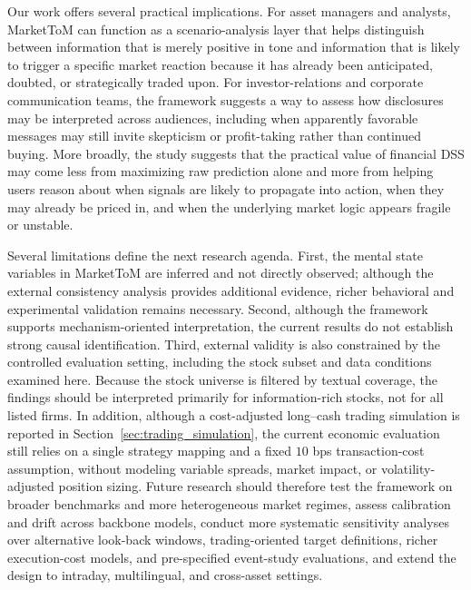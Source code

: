 \documentclass[a4paper,fleqn,doubleblind]{cas-sc}
\newcommand{\revise}[1]{{\color{blue}#1}}
\begin{document}
Our work offers several practical implications. For asset managers and analysts, MarketToM can function as a scenario-analysis layer that helps distinguish between information that is merely positive in tone and information that is likely to trigger a specific market reaction because it has already been anticipated, doubted, or strategically traded upon. For investor-relations and corporate communication teams, the framework suggests a way to assess how disclosures may be interpreted across audiences, including when apparently favorable messages may still invite skepticism or profit-taking rather than continued buying. More broadly, the study suggests that the practical value of financial DSS may come less from maximizing raw prediction alone and more from helping users reason about when signals are likely to propagate into action, when they may already be priced in, and when the underlying market logic appears fragile or unstable.

Several limitations define the next research agenda. First, the mental state variables in MarketToM are inferred and not directly observed; although the external consistency analysis provides additional evidence, richer behavioral and experimental validation remains necessary. Second, although the framework supports mechanism-oriented interpretation, the current results do not establish strong causal identification. Third, external validity is also constrained by the controlled evaluation setting, including the stock subset and data conditions examined here. \revise{Because the stock universe is filtered by textual coverage, the findings should be interpreted primarily for information-rich stocks, not for all listed firms. In addition, although a cost-adjusted long--cash trading simulation is reported in Section~\ref{sec:trading_simulation}, the current economic evaluation still relies on a single strategy mapping and a fixed $10$ bps transaction-cost assumption, without modeling variable spreads, market impact, or volatility-adjusted position sizing.} Future research should therefore test the framework on broader benchmarks and more heterogeneous market regimes, assess calibration and drift across backbone models, \revise{conduct more systematic sensitivity analyses over alternative look-back windows, trading-oriented target definitions, richer execution-cost models, and pre-specified event-study evaluations,} and extend the design to intraday, multilingual, and cross-asset settings.


\newpage

\end{document}
